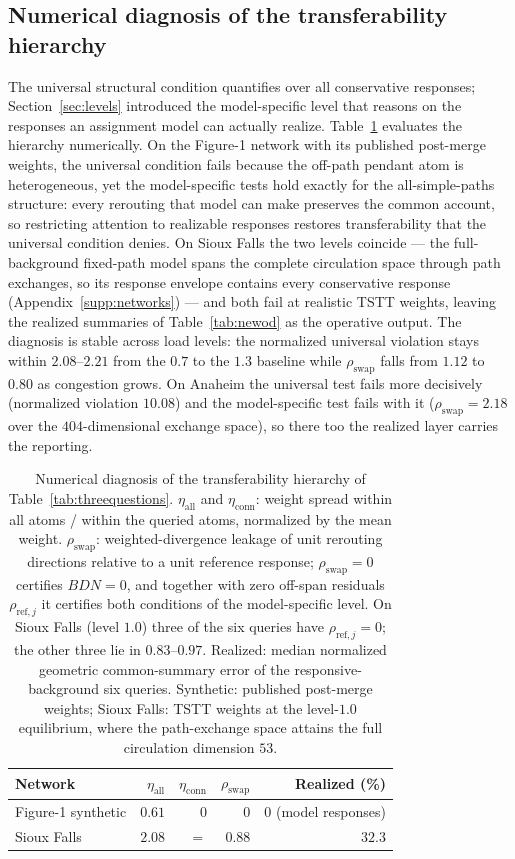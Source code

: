 \subsection{Numerical diagnosis of the transferability hierarchy}\label{supp:levelsdiag}
The universal structural condition quantifies over all conservative
responses; Section~\ref{sec:levels} introduced the model-specific level
that reasons on the responses an assignment model can actually realize.
Table~\ref{tab:levelsdiag} evaluates the hierarchy numerically. On the
Figure-1 network with its published post-merge weights, the universal
condition fails because the off-path pendant atom is heterogeneous, yet
the model-specific tests hold exactly for the all-simple-paths
structure: every rerouting that model can make preserves the common
account, so restricting attention to realizable responses restores
transferability that the universal condition denies. On Sioux Falls the
two levels coincide --- the full-background fixed-path model spans the
complete circulation space through path exchanges, so its response
envelope contains every conservative response
(Appendix~\ref{supp:networks}) --- and both fail at realistic TSTT
weights, leaving the realized summaries of Table~\ref{tab:newod} as the
operative output. The diagnosis is stable across load levels: the
normalized universal violation stays within $2.08$--$2.21$ from the
$0.7$ to the $1.3$ baseline while $\rho_{\mathrm{swap}}$ falls from
$1.12$ to $0.80$ as congestion grows. On Anaheim the universal test
fails more decisively (normalized violation $10.08$) and the
model-specific test fails with it ($\rho_{\mathrm{swap}}=2.18$ over the
$404$-dimensional exchange space), so there too the realized layer
carries the reporting.

\begin{table}[t]\centering\footnotesize
\caption{Numerical diagnosis of the transferability hierarchy of
Table~\ref{tab:threequestions}. $\eta_{\mathrm{all}}$ and
$\eta_{\mathrm{conn}}$: weight spread within all atoms / within the
queried atoms, normalized by the mean weight. $\rho_{\mathrm{swap}}$:
weighted-divergence leakage of unit rerouting directions relative to a
unit reference response; $\rho_{\mathrm{swap}}=0$ certifies
$BDN=0$, and together with zero off-span residuals
$\rho_{\mathrm{ref},j}$ it certifies both conditions of the
model-specific level. On Sioux Falls (level $1.0$) three of the six
queries have $\rho_{\mathrm{ref},j}=0$; the other three lie in
$0.83$--$0.97$. Realized: median
normalized geometric common-summary error of the responsive-background six
queries. Synthetic: published post-merge weights; Sioux Falls: TSTT
weights at the level-$1.0$ equilibrium, where the path-exchange space
attains the full circulation dimension $53$.}\label{tab:levelsdiag}
\begin{tabular}{lrrrr}\toprule
Network & $\eta_{\mathrm{all}}$ & $\eta_{\mathrm{conn}}$ & $\rho_{\mathrm{swap}}$ & Realized (\%)\\\midrule
Figure-1 synthetic & $0.61$ & $0$ & $0$ & $0$ (model responses)\\
Sioux Falls & $2.08$ & $=$ & $0.88$ & $32.3$\\
\bottomrule\end{tabular}\end{table}

